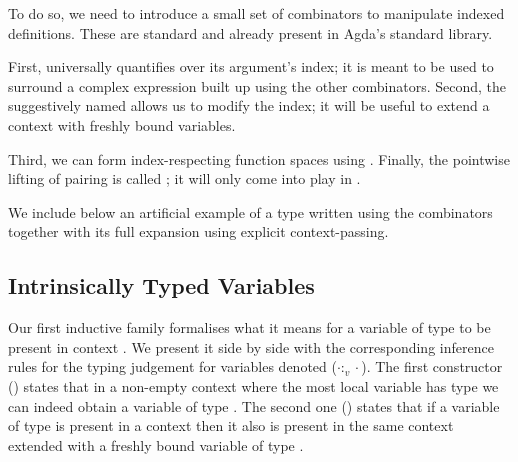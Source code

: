 \documentclass{article}
\begin{document}
To do so, we need to introduce a small set of combinators
to manipulate indexed definitions. These are standard and
already present in Agda's standard library.

\noindent
\begin{minipage}{.4\textwidth}
\end{minipage}\hfill
\begin{minipage}{.5\textwidth}
\end{minipage}

First,  universally quantifies over its argument's index;
it is meant to be used to surround a complex expression built
up using the other combinators.
%
Second, the suggestively named  allows us to modify
the index; it will be useful to extend a context with freshly
bound variables.

\noindent
\begin{minipage}{.4\textwidth}
\end{minipage}\hfill
\begin{minipage}{.5\textwidth}
\end{minipage}

Third, we can form index-respecting function spaces using .
%
Finally, the pointwise lifting of pairing is called ;
it will only come into play in .

We include below an artificial example of a type written using
the combinators together with its full expansion using explicit
context-passing.

\begin{AgdaSuppressSpace}
\end{AgdaSuppressSpace}

\subsection{Intrinsically Typed Variables}

Our first inductive family formalises what it means for a variable of type
 to be present in context . We present it side by side
with the corresponding inference rules for the typing judgement
for variables denoted ($\cdot :_v \cdot$).
%
The first constructor () states that in a non-empty context
where the most local variable has type  we can indeed obtain a
variable of type .
%
The second one () states that if a variable of type 
is present in a context then it also is present in the same context
extended with a freshly bound variable of type .
\end{document}

